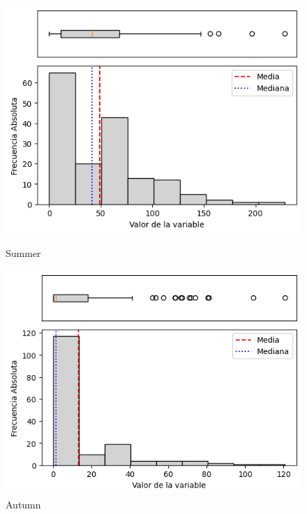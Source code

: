 \begin{figure}[H]
\centering
\begin{minipage}{0.30\textwidth}
  \includegraphics[width=\linewidth]{resultados/por_estacion_del_anio/boxplot_clases_por_estacion/Candavare/P_HistBoxplot_Summer.png}
  \caption*{Summer}
\end{minipage}
\hfill
\begin{minipage}{0.30\textwidth}
  \includegraphics[width=\linewidth]{resultados/por_estacion_del_anio/boxplot_clases_por_estacion/Candavare/P_HistBoxplot_Autumn.png}
  \caption*{Autumn}
\end{minipage}

\vspace{0.2cm}


\end{figure}
